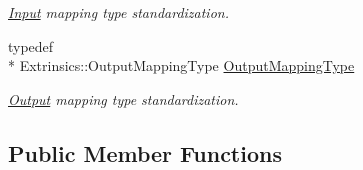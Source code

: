 \begin{DoxyCompactItemize}
\begin{DoxyCompactList}\small\item\em \hyperlink{classffnn_1_1layer_1_1_input}{Input} mapping type standardization. \end{DoxyCompactList}\item 
typedef \\*
Extrinsics\-::\-Output\-Mapping\-Type \hyperlink{classffnn_1_1layer_1_1_hidden_a9d882e035c7cd80ccd9b58fbe832591e}{Output\-Mapping\-Type}
\begin{DoxyCompactList}\small\item\em \hyperlink{classffnn_1_1layer_1_1_output}{Output} mapping type standardization. \end{DoxyCompactList}\end{DoxyCompactItemize}
\subsection*{Public Member Functions}

